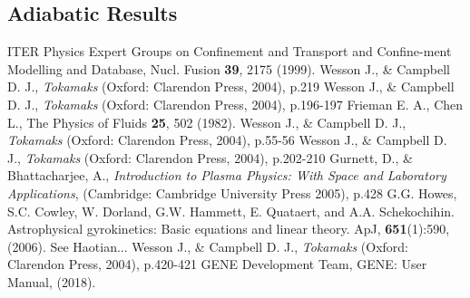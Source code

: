 \documentclass[12pt]{article}
\numberwithin{equation}{subsection}
\begin{document}
\subsection{Adiabatic Results}


\begin{thebibliography}{0}
   
    ITER Physics Expert Groups on Confinement and Transport and Confine-ment Modelling and Database, Nucl. Fusion \textbf{39}, 2175 (1999).
    Wesson J., \& Campbell D. J., \textit{Tokamaks} (Oxford: Clarendon Press, 2004), p.219
    Wesson J., \& Campbell D. J., \textit{Tokamaks} (Oxford: Clarendon Press, 2004), p.196-197
    Frieman E. A., Chen L., The Physics of Fluids \textbf{25}, 502 (1982).
    Wesson J., \& Campbell D. J., \textit{Tokamaks} (Oxford: Clarendon Press, 2004), p.55-56
    Wesson J., \& Campbell D. J., \textit{Tokamaks} (Oxford: Clarendon Press, 2004), p.202-210
    Gurnett, D., \& Bhattacharjee, A., \textit{Introduction to Plasma Physics: With Space and Laboratory Applications},
                       (Cambridge: Cambridge University Press 2005), p.428
    G.G. Howes, S.C. Cowley, W. Dorland, G.W. Hammett, E. Quataert, and A.A. Schekochihin.
                         Astrophysical gyrokinetics: Basic equations and linear theory. ApJ, \textbf{651}(1):590, (2006).
    See Haotian...
    Wesson J., \& Campbell D. J., \textit{Tokamaks} (Oxford: Clarendon Press, 2004), p.420-421
    GENE Development Team, GENE: User Manual, (2018).

\end{thebibliography}
    
\end{document}
